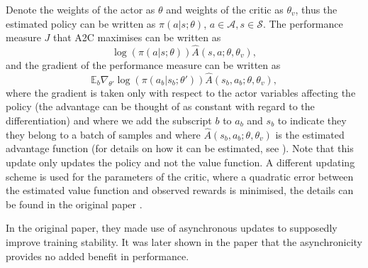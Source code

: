 Denote the weights of the actor as $\theta$ and weights of the critic as $\theta_v$, thus the estimated policy can be written as $\pi(a|s;\theta)$, $a \in \mathcal{A}, s \in \mathcal{S}$. The performance measure $J$ that A2C maximises can be written as 
\begin{equation*}
\log (\pi(a|s;\theta))\widehat{A}(s,a;\theta,\theta_v),
\end{equation*}
and the gradient of the performance measure can be written as
\begin{equation*}
\mathbb{E}_b \nabla_{\theta'} \log (\pi(a_b|s_b;\theta'))\widehat{A}(s_b,a_b;\theta,\theta_v),
\end{equation*}
where the gradient is taken only with respect to the actor variables affecting the policy (the advantage can be thought of as constant with regard to the differentiation) and where we add the subscript $b$ to $a_b$ and $s_b$ to indicate they they belong to a batch of samples and where $\widehat{A}(s_b,a_b;\theta,\theta_v)$ is the estimated advantage function (for details on how it can be estimated, see \cite[Section 4]{a3c_paper}). Note that this update only updates the policy and not the value function. A different updating scheme is used for the parameters of the critic, where a quadratic error between the estimated value function and observed rewards is minimised, the details can be found in the original paper \cite[Algorithm S3]{a3c_paper}.

In the original paper, they made use of asynchronous updates to supposedly improve training stability. It was later shown in the paper \cite{a3c_asynchrony_not_necessary} that the asynchronicity provides no added benefit in performance.


